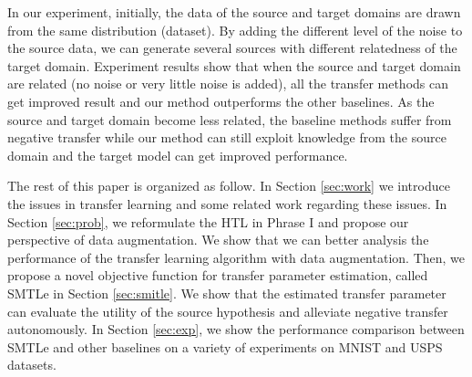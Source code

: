 In our experiment, initially, the data of the source and target domains are drawn from the same distribution (dataset). By adding the different level of the noise to the source data, we can generate several sources with different relatedness of the target domain. Experiment results show that when the source and target domain are related (no noise or very little noise is added), all the transfer methods can get improved result and our method outperforms the other baselines. As the source and target domain become less related, the baseline methods suffer from negative transfer while our method can still exploit knowledge from the source domain and the target model can get improved performance. 

The rest of this paper is organized as follow. In Section \ref{sec:work} we introduce the issues in transfer learning and some related work regarding these issues.
In Section \ref{sec:prob}, we reformulate the HTL in Phrase I and propose our perspective of data augmentation. We show that we can better analysis the performance of the transfer learning algorithm with data augmentation. Then, we propose a novel objective function for transfer parameter estimation, called SMTLe in Section \ref{sec:smitle}. We show that the estimated transfer parameter can evaluate the utility of the source hypothesis and alleviate negative transfer autonomously. In Section \ref{sec:exp}, we show the performance comparison between SMTLe and other baselines on a variety of experiments on MNIST and USPS datasets.
